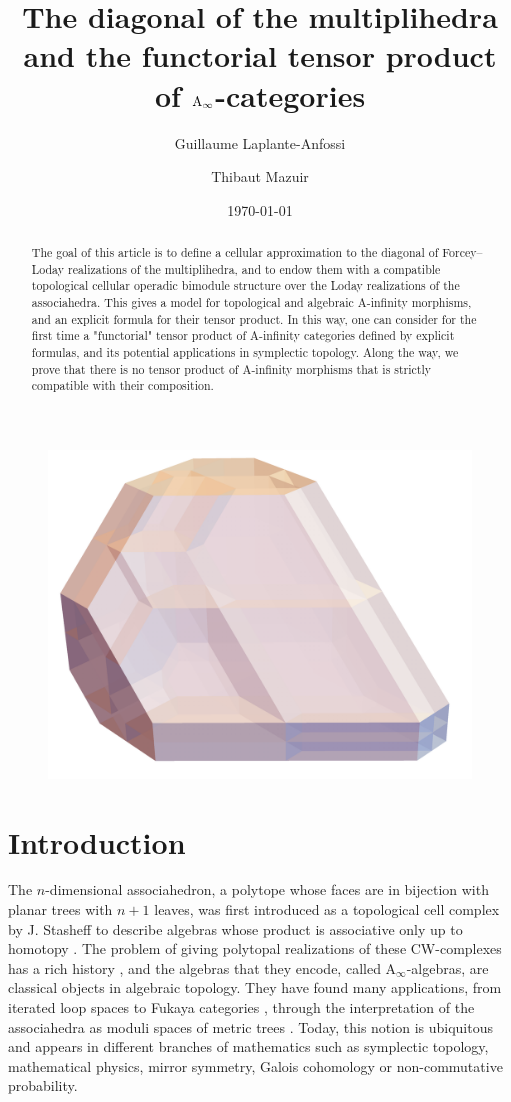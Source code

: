 \documentclass[twoside, 12pt]{amsart}
\title[The diagonal of the multiplihedra]{The diagonal of the multiplihedra and the functorial tensor product of $\mathrm{A}_\infty$-categories}
\author{Guillaume Laplante-Anfossi}
\author{Thibaut Mazuir}
\date{\today}
\theoremstyle{remark}
\newcommand{\J}{\mathrm{J}}
\begin{document}
\begin{abstract}
The goal of this article is to define a cellular approximation to the diagonal of Forcey--Loday realizations of the multiplihedra, and to endow them with a compatible topological cellular operadic bimodule structure over the Loday realizations of the associahedra. 
This gives a model for topological and algebraic A-infinity morphisms, and an explicit formula for their tensor product.
In this way, one can consider for the first time a "functorial" tensor product of A-infinity categories defined by explicit formulas, and its potential applications in symplectic topology. 
Along the way, we prove that there is no tensor product of A-infinity morphisms that is strictly compatible with their composition. 
\end{abstract}

\maketitle

\begin{figure}[h!]
\centering
\includegraphics[width=0.7\linewidth]{J4.png} 
\label{Fig5:J4}
\end{figure}

\setcounter{tocdepth}{1}
\tableofcontents


\section*{Introduction}

The $n$-dimensional associahedron, a polytope whose faces are in bijection with planar trees with $n+1$ leaves, was first introduced as a topological cell complex by J. Stasheff to describe algebras whose product is associative only up to homotopy \cite{Stasheff63}.
The problem of giving polytopal realizations of these CW-complexes has a rich history \cite{CeballosZiegler12}, and the algebras that they encode, called $\mathrm{A}_\infty$-algebras, are classical objects in algebraic topology. 
They have found many applications, from iterated loop spaces \cite{May72} to Fukaya categories \cite{Seidel08}, through the interpretation of the associahedra as moduli spaces of metric trees \cite{MauWoodward10}.
Today, this notion is ubiquitous and appears in different branches of mathematics such as symplectic topology, mathematical physics, mirror symmetry, Galois cohomology or non-commutative probability.
\end{document}
